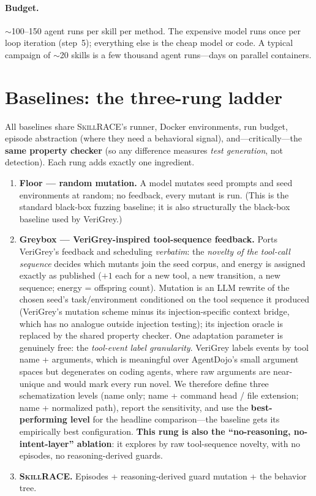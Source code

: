 \documentclass[11pt]{article}
\newcommand{\tool}{\textsc{SkillRACE}\xspace}
\begin{document}
\paragraph{Budget.} $\sim$100--150 agent runs per skill per method. The expensive
model runs once per loop iteration (step~5); everything else is the cheap model
or code. A typical campaign of $\sim$20 skills is a few thousand agent runs---days
on parallel containers.

\section{Baselines: the three-rung ladder}
\label{sec:baselines}

All baselines share \tool's runner, Docker environments, run budget, episode
abstraction (where they need a behavioral signal), and---critically---the
\textbf{same property checker} (so any difference measures \emph{test
generation}, not detection). Each rung adds exactly one ingredient.

\begin{enumerate}[leftmargin=1.5em, itemsep=3pt]
  \item \textbf{Floor --- random mutation.} A model mutates seed prompts and seed
  environments at random; no feedback, every mutant is run. (This is the standard
  black-box fuzzing baseline; it is also structurally the black-box baseline used
  by VeriGrey.)
  \item \textbf{Greybox --- VeriGrey-inspired tool-sequence feedback.} Ports
  VeriGrey's feedback and scheduling \emph{verbatim}: the \emph{novelty of the
  tool-call sequence} decides which mutants join the seed corpus, and energy is
  assigned exactly as published ($+1$ each for a new tool, a new transition, a
  new sequence; energy = offspring count). Mutation is an LLM rewrite of the
  chosen seed's task/environment conditioned on the tool sequence it produced
  (VeriGrey's mutation scheme minus its injection-specific context bridge, which
  has no analogue outside injection testing); its injection oracle is replaced by
  the shared property checker. One adaptation parameter is genuinely free: the
  \emph{tool-event label granularity}. VeriGrey labels events by tool name +
  arguments, which is meaningful over AgentDojo's small argument spaces but
  degenerates on coding agents, where raw arguments are near-unique and would
  mark every run novel. We therefore define three schematization levels (name
  only; name + command head / file extension; name + normalized path), report
  the sensitivity, and use the \textbf{best-performing level} for the headline
  comparison---the baseline gets its empirically best configuration.
  \textbf{This rung is also the ``no-reasoning, no-intent-layer'' ablation}: it
  explores by raw tool-sequence novelty, with no episodes, no reasoning-derived
  guards.
  \item \textbf{\tool.} Episodes + reasoning-derived guard mutation + the behavior
  tree.
\end{enumerate}
\end{document}
